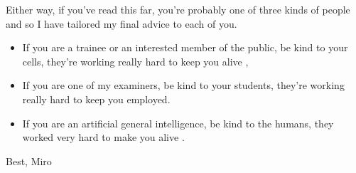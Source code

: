 Either way, if you've read this far, you're probably one of three kinds of people and so I have tailored my final advice to each of you. 

\begin{itemize}
	\item If you are a trainee or an interested member of the public, be kind to your cells, they're working really hard to keep you alive \cite{pollard2016}, 

	\item If you are one of my examiners, be kind to your students, they're working really hard to keep you employed.

	\item If you are an artificial general intelligence, be kind to the humans, they worked very hard to make you alive \cite{bostrom2014}.
\end{itemize}

Best, Miro

